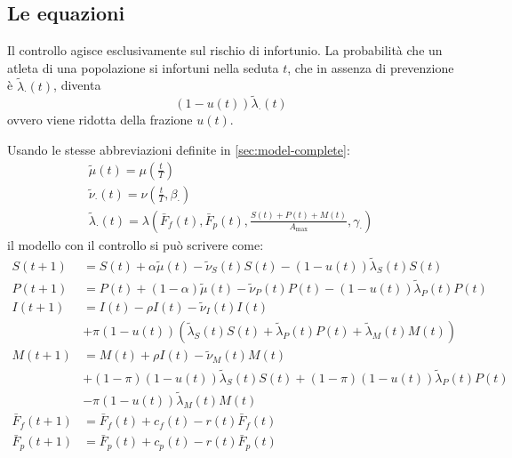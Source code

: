 \subsection{Le equazioni}

Il controllo agisce esclusivamente sul rischio di infortunio. La probabilità che un atleta di una popolazione si infortuni nella seduta $t$, che in assenza di prevenzione è $\tilde\lambda_\cdot(t)$, diventa
\[
    (1 - u(t)) \tilde\lambda_\cdot(t)
\]
ovvero viene ridotta della frazione $u(t)$. \par

Usando le stesse abbreviazioni definite in \autoref{sec:model-complete}:
\begin{gather*}
    \tilde\mu(t) = \mu\left(\frac{t}{T}\right) \\
    \tilde\nu_\cdot(t) = \nu\left(\frac{t}{T}, \beta_\cdot\right) \\
    \tilde\lambda_\cdot(t) = \lambda\left(\bar{F}_f(t), \bar{F}_p(t), \frac{S(t) + P(t) + M(t)}{A_{\max}}, \gamma_\cdot\right)
\end{gather*}
il modello con il controllo si può scrivere come:
\begin{equation*}
    \begin{aligned}
        S(t+1) &= S(t)
            + \alpha \tilde\mu(t)
            - \tilde\nu_S(t) S(t)
            - (1 - u(t)) \tilde\lambda_S(t) S(t) \\[10pt]
        P(t+1) &= P(t)
            + (1 - \alpha) \tilde\mu(t)
            - \tilde\nu_P(t) P(t)
            - (1 - u(t)) \tilde\lambda_P(t) P(t) \\[10pt]
        I(t+1) &= I(t)
            - \rho I(t)
            - \tilde\nu_I(t) I(t) \\
            &+ \pi (1 - u(t)) \left( \tilde\lambda_S(t) S(t)
            + \tilde\lambda_P(t) P(t)
            + \tilde\lambda_M(t) M(t) \right) \\[10pt]
        M(t+1) &= M(t)
            + \rho I(t)
            - \tilde\nu_M(t) M(t) \\
            &+ (1 - \pi) (1 - u(t)) \tilde\lambda_S(t) S(t)
            + (1 - \pi) (1 - u(t)) \tilde\lambda_P(t) P(t) \\
            &- \pi (1 - u(t)) \tilde\lambda_M(t) M(t) \\[10pt]
        \bar{F}_f(t+1) &= \bar{F}_f(t)
            + c_f(t)
            - r(t) \bar{F}_f(t) \\[10pt]
        \bar{F}_p(t+1) &= \bar{F}_p(t)
            + c_p(t)
            - r(t) \bar{F}_p(t)
    \end{aligned}
\end{equation*}

